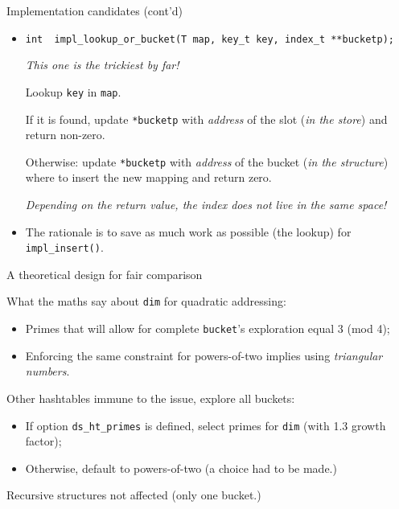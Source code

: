 \begin{frame}[fragile]{Implementation candidates (cont'd)}

  \begin{itemize}
  \item \lstinline{int  impl_lookup_or_bucket(T map, key_t key, index_t **bucketp);}

    {\em This one is the trickiest by far!}
    
    Lookup \lstinline{key} in \lstinline{map}.

    If it is found, update \lstinline{*bucketp} with {\em address} of the slot ({\em in the store}) and return non-zero.

    Otherwise: update \lstinline{*bucketp} with {\em address} of the bucket ({\em in the structure}) where to insert the new mapping and return zero.

    {\em Depending on the return value, the index does not live in the same space!}

  \item The rationale is to save as much work as possible (the lookup) for \lstinline{impl_insert()}.
  \end{itemize}

\end{frame}


\begin{frame}[fragile]{A theoretical design for fair comparison}

  What the maths say about \lstinline{dim} for quadratic addressing:
  \begin{itemize}
  \item Primes that will allow for complete \lstinline{bucket}'s exploration equal 3 (mod 4);
  \item Enforcing the same constraint for powers-of-two implies using {\em triangular numbers}.
  \end{itemize}

  Other hashtables immune to the issue, explore all buckets:

  \begin{itemize}
  \item If option \lstinline{ds_ht_primes} is defined, select primes for \lstinline{dim} (with 1.3 growth factor);
  \item Otherwise, default to powers-of-two (a choice had to be made.)
  \end{itemize}

  Recursive structures not affected (only one bucket.)
  
\end{frame}


